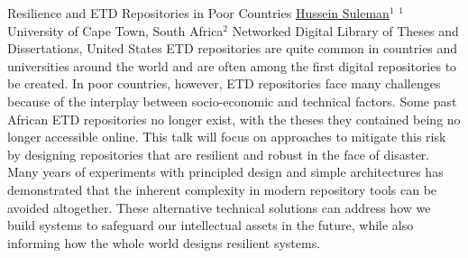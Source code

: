 
    \begin{abstract_online}{Resilience and ETD Repositories in Poor Countries}{%
        \underline{Hussein Suleman}$^{1}$}{%
        }{%
        $^1$ University of Cape Town, South Africa\newline{}$^2$ Networked Digital Library of Theses and Dissertations, United States}
        ETD repositories are quite common in countries and universities around the world and are often among the first digital repositories to be created.  In poor countries, however, ETD repositories face many challenges because of the interplay between socio-economic and technical factors.  Some past African ETD repositories no longer exist, with the theses they contained being no longer accessible online.  This talk will focus on approaches to mitigate this risk by designing repositories that are resilient and robust in the face of disaster.  Many years of experiments with principled design and simple architectures has demonstrated that the inherent complexity in modern repository tools can be avoided altogether.  These alternative technical solutions can address how we build systems to safeguard our intellectual assets in the future, while also informing how the whole world designs resilient systems.
    
    \end{abstract_online}
    
